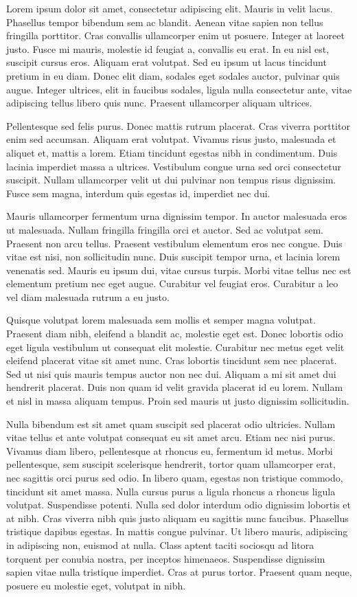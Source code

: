 \documentclass{revtex4}
\begin{document}
Lorem ipsum dolor sit amet, consectetur adipiscing elit. Mauris in velit lacus. Phasellus tempor bibendum sem ac blandit. Aenean vitae sapien non tellus fringilla porttitor. Cras convallis ullamcorper enim ut posuere. Integer at laoreet justo. Fusce mi mauris, molestie id feugiat a, convallis eu erat. In eu nisl est, suscipit cursus eros. Aliquam erat volutpat. Sed eu ipsum ut lacus tincidunt pretium in eu diam. Donec elit diam, sodales eget sodales auctor, pulvinar quis augue. Integer ultrices, elit in faucibus sodales, ligula nulla consectetur ante, vitae adipiscing tellus libero quis nunc. Praesent ullamcorper aliquam ultrices.

Pellentesque sed felis purus. Donec mattis rutrum placerat. Cras viverra porttitor enim sed accumsan. Aliquam erat volutpat. Vivamus risus justo, malesuada et aliquet et, mattis a lorem. Etiam tincidunt egestas nibh in condimentum. Duis lacinia imperdiet massa a ultrices. Vestibulum congue urna sed orci consectetur suscipit. Nullam ullamcorper velit ut dui pulvinar non tempus risus dignissim. Fusce sem magna, interdum quis egestas id, imperdiet nec dui.

Mauris ullamcorper fermentum urna dignissim tempor. In auctor malesuada eros ut malesuada. Nullam fringilla fringilla orci et auctor. Sed ac volutpat sem. Praesent non arcu tellus. Praesent vestibulum elementum eros nec congue. Duis vitae est nisi, non sollicitudin nunc. Duis suscipit tempor urna, et lacinia lorem venenatis sed. Mauris eu ipsum dui, vitae cursus turpis. Morbi vitae tellus nec est elementum pretium nec eget augue. Curabitur vel feugiat eros. Curabitur a leo vel diam malesuada rutrum a eu justo.

Quisque volutpat lorem malesuada sem mollis et semper magna volutpat. Praesent diam nibh, eleifend a blandit ac, molestie eget est. Donec lobortis odio eget ligula vestibulum ut consequat elit molestie. Curabitur nec metus eget velit eleifend placerat vitae sit amet nunc. Cras lobortis tincidunt sem nec placerat. Sed ut nisi quis mauris tempus auctor non nec dui. Aliquam a mi sit amet dui hendrerit placerat. Duis non quam id velit gravida placerat id eu lorem. Nullam et nisl in massa aliquam tempus. Proin sed mauris ut justo dignissim sollicitudin.

Nulla bibendum est sit amet quam suscipit sed placerat odio ultricies. Nullam vitae tellus et ante volutpat consequat eu sit amet arcu. Etiam nec nisi purus. Vivamus diam libero, pellentesque at rhoncus eu, fermentum id metus. Morbi pellentesque, sem suscipit scelerisque hendrerit, tortor quam ullamcorper erat, nec sagittis orci purus sed odio. In libero quam, egestas non tristique commodo, tincidunt sit amet massa. Nulla cursus purus a ligula rhoncus a rhoncus ligula volutpat. Suspendisse potenti. Nulla sed dolor interdum odio dignissim lobortis et at nibh. Cras viverra nibh quis justo aliquam eu sagittis nunc faucibus. Phasellus tristique dapibus egestas. In mattis congue pulvinar. Ut libero mauris, adipiscing in adipiscing non, euismod at nulla. Class aptent taciti sociosqu ad litora torquent per conubia nostra, per inceptos himenaeos. Suspendisse dignissim sapien vitae nulla tristique imperdiet. Cras at purus tortor. Praesent quam neque, posuere eu molestie eget, volutpat in nibh. 
\end{document}
